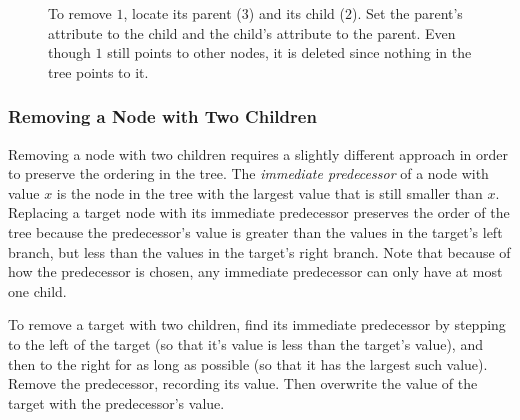 \begin{figure}[H]
\caption{To remove $1$, locate its parent ($3$) and its child ($2$).
Set the parent's  attribute to the child and the child's  attribute to the parent.
Even though $1$ still points to other nodes, it is deleted since nothing in the tree points to it.}
\label{fig:BST.remove_OneChild}
\end{figure}

\subsubsection*{Removing a Node with Two Children} %

Removing a node with two children requires a slightly different approach in order to preserve the ordering in the tree.
The \emph{immediate predecessor} of a node with value $x$ is the node in the tree with the largest value that is still smaller than $x$.
Replacing a target node with its immediate predecessor preserves the order of the tree because the predecessor's value is greater than the values in the target's left branch, but less than the values in the target's right branch.
Note that because of how the predecessor is chosen, any immediate predecessor can only have at most one child. %

To remove a target with two children, find its immediate predecessor by stepping to the left of the target (so that it's value is less than the target's value), and then to the right for as long as possible (so that it has the largest such value).
Remove the predecessor, recording its value.
Then overwrite the value of the target with the predecessor's value.

